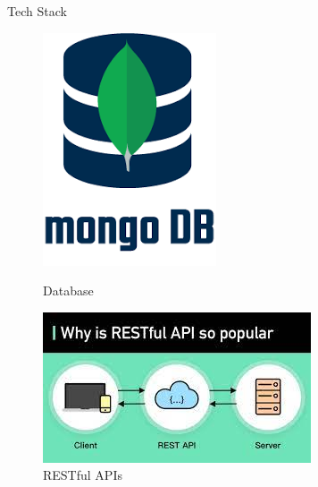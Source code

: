 \documentclass{beamer}
\begin{document}
\begin{frame}{Tech Stack}
\begin{figure}
\begin{minipage}[t]{0.2\textwidth}
            \includegraphics[width=\textwidth]{mongoDB.png}
            \caption{Database}
        \end{minipage}\hfill
        \begin{minipage}[t]{0.2\textwidth}
            \centering
            \includegraphics[width=\textwidth]{API.jpeg}
            \caption{RESTful APIs}
        \end{minipage}\hfill
    \end{figure}
\end{frame}
\end{document}

